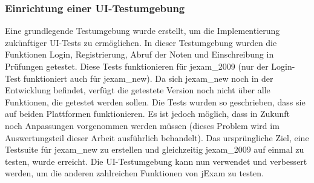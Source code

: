 \subsubsection{Einrichtung einer UI-Testumgebung}

Eine grundlegende Testumgebung wurde erstellt, um die Implementierung
zukünftiger UI-Tests zu ermöglichen. In dieser Testumgebung wurden die
Funktionen Login, Registrierung, Abruf der Noten und Einschreibung in
Prüfungen getestet. Diese Tests funktionieren für \gls{jexam_2009} (nur
der Login-Test funktioniert auch für \gls{jexam_new}). Da sich \gls{jexam_new}
noch in der Entwicklung befindet, verfügt die getestete Version noch
nicht über alle Funktionen, die getestet werden sollen.  Die Tests
wurden so geschrieben, dass sie auf beiden Plattformen funktionieren.
Es ist jedoch möglich, dass in Zukunft noch Anpassungen vorgenommen
werden müssen (dieses Problem wird im Auswertungsteil dieser Arbeit
ausführlich behandelt). Das ursprüngliche Ziel, eine Testsuite für
\gls{jexam_new} zu erstellen und gleichzeitig \gls{jexam_2009} auf
einmal zu testen, wurde erreicht. Die UI-Testumgebung kann nun
verwendet und verbessert werden, um die anderen zahlreichen Funktionen
von jExam zu testen.
